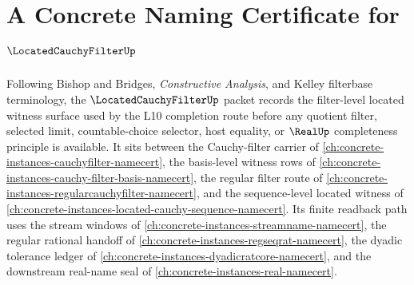 \chapter{A Concrete Naming Certificate for $\LocatedCauchyFilterUp$}
\label{ch:concrete-instances-located-cauchy-filter-namecert}

Following Bishop and Bridges, \emph{Constructive Analysis}, and Kelley filterbase terminology, the $\LocatedCauchyFilterUp$ packet records the filter-level located witness surface used by the L10 completion route before any quotient filter, selected limit, countable-choice selector, host equality, or $\RealUp$ completeness principle is available. It sits between the Cauchy-filter carrier of \autoref{ch:concrete-instances-cauchyfilter-namecert}, the basis-level witness rows of \autoref{ch:concrete-instances-cauchy-filter-basis-namecert}, the regular filter route of \autoref{ch:concrete-instances-regularcauchyfilter-namecert}, and the sequence-level located witness of \autoref{ch:concrete-instances-located-cauchy-sequence-namecert}. Its finite readback path uses the stream windows of \autoref{ch:concrete-instances-streamname-namecert}, the regular rational handoff of \autoref{ch:concrete-instances-regseqrat-namecert}, the dyadic tolerance ledger of \autoref{ch:concrete-instances-dyadicratcore-namecert}, and the downstream real-name seal of \autoref{ch:concrete-instances-real-namecert}.


